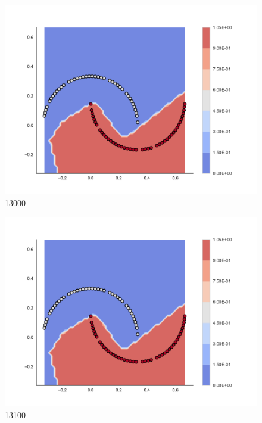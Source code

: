\begin{subfigure}[b]{0.09\textwidth}
    \includegraphics[clip, trim=2.35cm 1.75cm 4.5cm 0cm,width=\textwidth]{img/convergence/13000.pdf}
    \caption{13000}
    \label{fig:convergence_13000}
\end{subfigure}
%
\begin{subfigure}[b]{0.09\textwidth}
    \includegraphics[clip, trim=2.35cm 1.75cm 4.5cm 0cm,width=\textwidth]{img/convergence/13100.pdf}
    \caption{13100}
    \label{fig:convergence_13100}
\end{subfigure}
%
